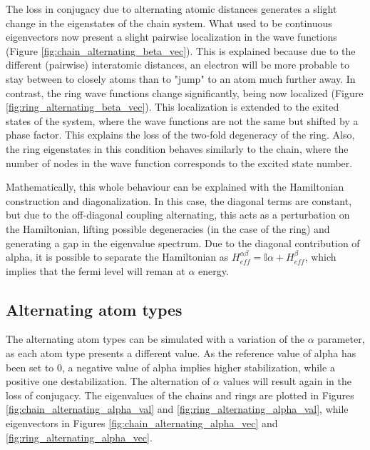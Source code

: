 \documentclass[twocolumn]{article}
\begin{document}
The loss in conjugacy due to alternating atomic distances generates a slight change in the eigenstates of the chain system. What used to be continuous eigenvectors now present a slight pairwise localization in the wave functions (Figure \ref{fig:chain_alternating_beta_vec}). This is explained because due to the different (pairwise) interatomic distances, an electron will be more probable to stay between to closely atoms than to "jump" to an atom much further away. In contrast, the ring wave functions change significantly, being now localized (Figure \ref{fig:ring_alternating_beta_vec}). This localization is extended to the exited states of the system, where the wave functions are not the same but shifted by a phase factor. This explains the loss of the two-fold degeneracy of the ring.  Also, the ring eigenstates in this condition behaves similarly to the chain, where the number of nodes in the wave function corresponds to the excited state number.

Mathematically, this whole behaviour can be explained with the Hamiltonian construction and diagonalization. In this case, the diagonal terms are constant, but due to the off-diagonal coupling alternating, this acts as a perturbation on the Hamiltonian, lifting possible degeneracies (in the case of the ring) and generating a gap in the eigenvalue spectrum. Due to the diagonal contribution of alpha, it is possible to separate the Hamiltonian as $H_{eff}^{\alpha\beta} = \mathbb{I} \alpha + H_{eff}^\beta$, which implies that the fermi level will reman at $\alpha$ energy. 

\subsection{Alternating atom types}
The alternating atom types can be simulated with a variation of the $\alpha$ parameter, as each atom type presents a different value. As the reference value of alpha has been set to $0$, a negative value of alpha implies higher stabilization, while a positive one destabilization. The alternation of $\alpha$ values will result again in the loss of conjugacy. The eigenvalues of the chains and rings are plotted in Figures \ref{fig:chain_alternating_alpha_val} and \ref{fig:ring_alternating_alpha_val}, while eigenvectors in Figures \ref{fig:chain_alternating_alpha_vec} and \ref{fig:ring_alternating_alpha_vec}.
\end{document}
